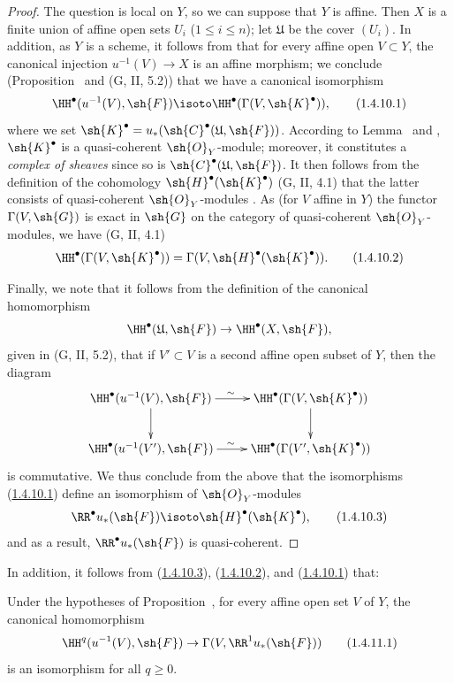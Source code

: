 \begin{proof}
The question is local on $Y$, so we can suppose that $Y$ is affine.
Then $X$ is a finite union of affine open sets $U_i$ ($1\leq i\leq n$); let $\mathfrak{U}$ be the cover $(U_i)$.
In addition, as $Y$ is a scheme, it follows from  that for every affine open $V\subset Y$, the canonical injection $u^{-1}(V)\to X$ is an affine morphism; we conclude (Proposition~ and (G, II, 5.2)) that we have a canonical isomorphism
\[
  \HH^\bullet(u^{-1}(V),\sh{F})\isoto\HH^\bullet(\Gamma(V,\sh{K}^\bullet)),
  \tag{1.4.10.1}\label{III.1.4.10.1}
\]
where we set $\sh{K}^\bullet=u_*(\sh{C}^\bullet(\mathfrak{U},\sh{F}))$.
According to Lemma~ and , $\sh{K}^\bullet$ is a quasi-coherent $\sh{O}_Y$-module; moreover, it constitutes a \emph{complex of sheaves} since so is $\sh{C}^\bullet(\mathfrak{U},\sh{F})$.
It then follows from the definition of the cohomology $\sh{H}^\bullet(\sh{K}^\bullet)$ (G, II, 4.1) that the latter consists of quasi-coherent $\sh{O}_Y$-modules .
As (for $V$ affine in $Y$) the functor $\Gamma(V,\sh{G})$ is exact in $\sh{G}$ on the category of quasi-coherent $\sh{O}_Y$-modules, we have (G, II, 4.1)
\[
  \HH^\bullet(\Gamma(V,\sh{K}^\bullet))=\Gamma(V,\sh{H}^\bullet(\sh{K}^\bullet)).
  \tag{1.4.10.2}\label{III.1.4.10.2}
\]

Finally, we note that it follows from the definition of the canonical homomorphism
\[
  \HH^\bullet(\mathfrak{U},\sh{F})\to\HH^\bullet(X,\sh{F}),
\]
given in (G, II, 5.2), that if $V'\subset V$ is a second affine open subset of $Y$, then the
diagram
\[
  \xymatrix{
    \HH^\bullet(u^{-1}(V),\sh{F})\ar[r]^\sim\ar[d] &
    \HH^\bullet(\Gamma(V,\sh{K}^\bullet))\ar[d]\\
    \HH^\bullet(u^{-1}(V'),\sh{F})\ar[r]^\sim &
    \HH^\bullet(\Gamma(V',\sh{K}^\bullet))
  }
\]
is commutative.
We thus conclude from the above that the isomorphisms (\hyperref[III.1.4.10.1]{1.4.10.1}) define an isomorphism of $\sh{O}_Y$-modules
\[
  \RR^\bullet u_*(\sh{F})\isoto\sh{H}^\bullet(\sh{K}^\bullet),
  \tag{1.4.10.3}\label{III.1.4.10.3}
\]
and as a result, $\RR^\bullet u_*(\sh{F})$ is quasi-coherent.
\end{proof}

In addition, it follows from (\hyperref[III.1.4.10.3]{1.4.10.3}), (\hyperref[III.1.4.10.2]{1.4.10.2}), and (\hyperref[III.1.4.10.1]{1.4.10.1}) that:
\begin{corollary}[1.4.11]
\label{III.1.4.11}
Under the hypotheses of Proposition~, for every affine open set $V$ of $Y$, the canonical homomorphism
\[
  \HH^q(u^{-1}(V),\sh{F})\to\Gamma(V,\RR^1 u_*(\sh{F}))
  \tag{1.4.11.1}\label{III.1.4.11.1}
\]
is an isomorphism for all $q\geq 0$.
\end{corollary}

